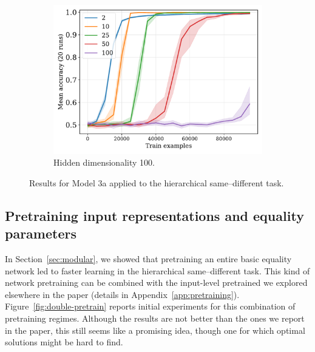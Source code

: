 \documentclass{article}
\newcommand{\secref}[1]{Section~\ref{#1}}
\newcommand{\Figref}[1]{Figure~\ref{#1}}
\newcommand{\appref}[1]{Appendix~\ref{#1}}
\begin{document}
\begin{figure}[H]
  \begin{subfigure}{0.45\linewidth}
    \includegraphics[width=1\textwidth]{./flatpremack-h2-train_size-embed_dim-hidden_dim=100.pdf}
    \caption{Hidden dimensionality 100.}
    \label{fig:model3a-rep}
  \end{subfigure}
  \caption{Results for Model 3a applied to the hierarchical same--different task.}
  \label{fig:model3a}
\end{figure}

\newpage

\subsection{Pretraining input representations and equality parameters}\label{app:double-pretrain}

In \secref{sec:modular}, we showed that pretraining an entire basic equality network led to faster learning in the hierarchical same--different task. This kind of network pretraining can be combined with the input-level pretrained we explored elsewhere in the paper (details in \appref{app:pretraining}). \Figref{fig:double-pretrain} reports initial experiments for this combination of pretraining regimes. Although the results are not better than the ones we report in the paper, this still seems like a promising idea, though one for which optimal solutions might be hard to find.
\end{document}
